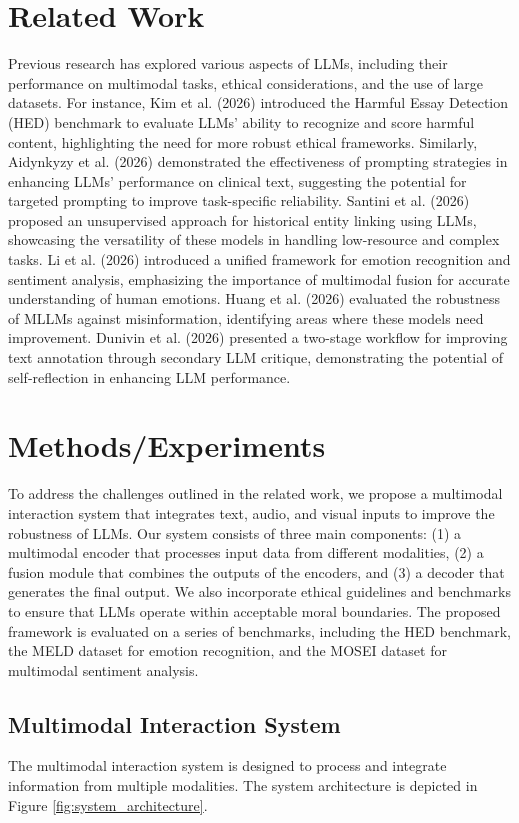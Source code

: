 \documentclass[11pt]{article}
\begin{document}
\section{Related Work}
Previous research has explored various aspects of LLMs, including their performance on multimodal tasks, ethical considerations, and the use of large datasets. For instance, Kim et al. (2026) introduced the Harmful Essay Detection (HED) benchmark to evaluate LLMs' ability to recognize and score harmful content, highlighting the need for more robust ethical frameworks. Similarly, Aidynkyzy et al. (2026) demonstrated the effectiveness of prompting strategies in enhancing LLMs' performance on clinical text, suggesting the potential for targeted prompting to improve task-specific reliability. Santini et al. (2026) proposed an unsupervised approach for historical entity linking using LLMs, showcasing the versatility of these models in handling low-resource and complex tasks. Li et al. (2026) introduced a unified framework for emotion recognition and sentiment analysis, emphasizing the importance of multimodal fusion for accurate understanding of human emotions. Huang et al. (2026) evaluated the robustness of MLLMs against misinformation, identifying areas where these models need improvement. Dunivin et al. (2026) presented a two-stage workflow for improving text annotation through secondary LLM critique, demonstrating the potential of self-reflection in enhancing LLM performance.

\section{Methods/Experiments}
To address the challenges outlined in the related work, we propose a multimodal interaction system that integrates text, audio, and visual inputs to improve the robustness of LLMs. Our system consists of three main components: (1) a multimodal encoder that processes input data from different modalities, (2) a fusion module that combines the outputs of the encoders, and (3) a decoder that generates the final output. We also incorporate ethical guidelines and benchmarks to ensure that LLMs operate within acceptable moral boundaries. The proposed framework is evaluated on a series of benchmarks, including the HED benchmark, the MELD dataset for emotion recognition, and the MOSEI dataset for multimodal sentiment analysis.

\subsection{Multimodal Interaction System}
The multimodal interaction system is designed to process and integrate information from multiple modalities. The system architecture is depicted in Figure \ref{fig:system_architecture}.
\end{document}
